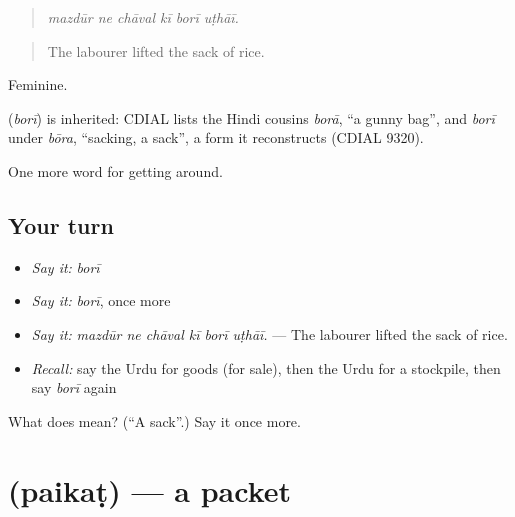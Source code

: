 \begin{quote}
     
\end{quote}

\begin{quote}
\emph{mazdūr ne chāval kī borī uṭhāī.}
\end{quote}

\begin{quote}
The labourer lifted the sack of rice.
\end{quote}

Feminine.

\begin{cousinweb}
\textbf{} (\emph{borī}) is inherited: CDIAL lists the Hindi cousins \emph{borā}, \textquotedblleft{}a gunny bag\textquotedblright{}, and \emph{borī} under \emph{bōra}, \textquotedblleft{}sacking, a sack\textquotedblright{}, a form it reconstructs (CDIAL 9320).
\end{cousinweb}

\begin{grammarlens}[title={What you've built}]
One more word for getting around.
\end{grammarlens}

\subsection*{Your turn}
\begin{itemize}
\raggedright
  \item \emph{Say it:} \emph{borī}
  \item \emph{Say it:} \emph{borī}, once more
  \item \emph{Say it:} \emph{mazdūr ne chāval kī borī uṭhāī.} — The labourer lifted the sack of rice.
  \item \emph{Recall:} say the Urdu for goods (for sale), then the Urdu for a stockpile, then say \emph{borī} again
\end{itemize}

\begin{tcolorbox}[breakable,colback=teal!4,colframe=teal!35!black,title={Before you move on}]
What does  mean? (\textquotedblleft{}A sack\textquotedblright{}.) Say it once more.
\end{tcolorbox}
\section[\texorpdfstring{\ur{پیکٹ} (paikaṭ)}{پیکٹ (paikaṭ)}]{ (paikaṭ) — a packet}

